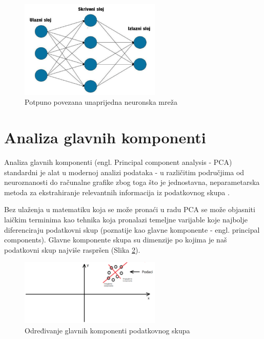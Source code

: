 \documentclass[times, utf8, proizvoljni, numeric]{fer}
\begin{document}
\begin{figure}[!ht]
	\begin{center}
		\captionsetup{justification=centering}
		\includegraphics[width=0.6\textwidth]{./imgs/potpuno_povezana.png}
		\caption{Potpuno povezana unaprijedna neuronska mreža}
		\label{fg:potpuno_povezana}
	\end{center}
\end{figure}

\section{Analiza glavnih komponenti}

Analiza glavnih komponenti (engl. Principal component analysis - PCA) standardni je alat u modernoj analizi podataka - u različitim područjima od neuroznanosti do računalne grafike zbog toga što je jednostavna, neparametarska metoda za ekstrahiranje relevantnih informacija iz podatkovnog skupa \cite{PCA}.

Bez ulaženja u matematiku koja se može pronaći u radu \cite{PCA} PCA se može objasniti laičkim terminima kao tehnika koja pronalazi temeljne varijable koje najbolje diferenciraju podatkovni skup (poznatije kao glavne komponente - engl. principal components). Glavne komponente skupa su dimenzije po kojima je naš podatkovni skup najviše raspršen (Slika \ref{fg:pca_start}).

\begin{figure}[!ht]
	\begin{center}
		\captionsetup{justification=centering}
		\includegraphics[width=0.6\textwidth]{./imgs/pca_start.png}
		\caption{Određivanje glavnih komponenti podatkovnog skupa}
		\label{fg:pca_start}
	\end{center}
\end{figure}
\end{document}

